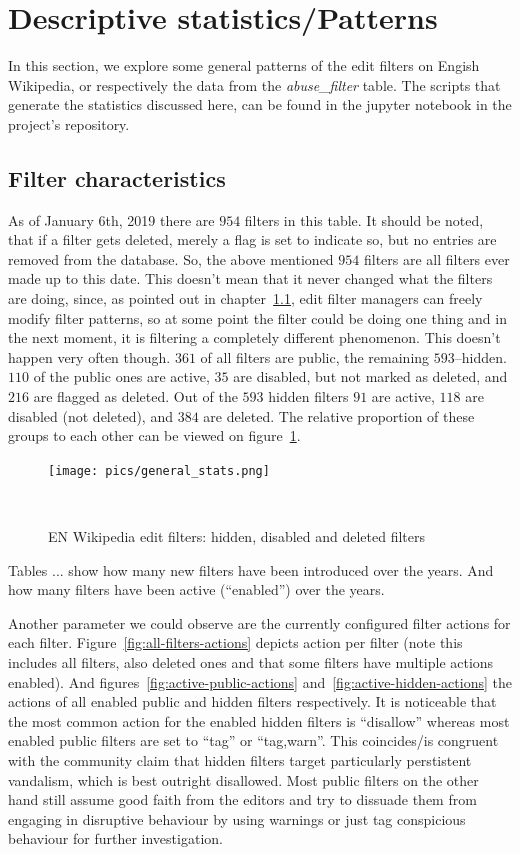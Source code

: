 \section{Descriptive statistics/Patterns}
\label{sec:patterns}

In this section, we explore some general patterns of the edit filters on Engish Wikipedia, or respectively the data from the \emph{abuse\_filter} table.
The scripts that generate the statistics discussed here, can be found in the jupyter notebook in the project's repository. %

\subsection{Filter characteristics}
As of January 6th, 2019 there are $954$ filters in this table.
It should be noted, that if a filter gets deleted, merely a flag is set to indicate so, but no entries are removed from the database.
So, the above mentioned $954$ filters are all filters ever made up to this date.
This doesn't mean that it never changed what the filters are doing, since, as pointed out in chapter~\ref{}, edit filter managers can freely modify filter patterns, so at some point the filter could be doing one thing and in the next moment, it is filtering a completely different phenomenon.
This doesn't happen very often though.
$361$ of all filters are public, the remaining $593$–hidden.
$110$ of the public ones are active, $35$ are disabled, but not marked as deleted, and $216$ are flagged as deleted.
Out of the $593$ hidden filters $91$ are active, $118$ are disabled (not deleted), and $384$ are deleted.
The relative proportion of these groups to each other can be viewed on figure~\ref{fig:general-stats}.

\begin{figure}
\centering
  \texttt{[image: pics/general\_stats.png]}
  \caption{EN Wikipedia edit filters: hidden, disabled and deleted filters}~\label{fig:general-stats}
\end{figure}


Tables ... show how many new filters have been introduced over the years.
And how many filters have been active (``enabled'') over the years. %

Another parameter we could observe are the currently configured filter actions for each filter.
Figure~\ref{fig:all-filters-actions} depicts action per filter (note this includes all filters, also deleted ones and that some filters have multiple actions enabled).
And figures~\ref{fig:active-public-actions} and~\ref{fig:active-hidden-actions} the actions of all enabled public and hidden filters respectively.
It is noticeable that the most common action for the enabled hidden filters is ``disallow'' whereas most enabled public filters are set to ``tag'' or ``tag,warn''.
This coincides/is congruent with the community claim that hidden filters target particularly perstistent vandalism, which is best outright disallowed.
Most public filters on the other hand still assume good faith from the editors and try to dissuade them from engaging in disruptive behaviour by using warnings or just tag conspicious behaviour for further investigation.

